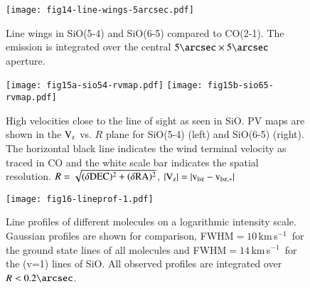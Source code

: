 \documentclass{aa}
\newcommand{\kms}{\,km\,s$^{-1}$~}
\begin{document}
\begin{figure}[ht]
    \centering
    \texttt{[image: fig14-line-wings-5arcsec.pdf]}
    \caption{Line wings in SiO(5-4) and SiO(6-5) compared to CO(2-1). The 
             emission is integrated over the central 
             $5\arcsec \times 5\arcsec$ aperture.}
    \label{siowingfig}
\end{figure}

\begin{figure}[ht]
    \centering
    \texttt{[image: fig15a-sio54-rvmap.pdf]}
    \texttt{[image: fig15b-sio65-rvmap.pdf]}
    \caption{High velocities close to the line of sight as seen in
             SiO. PV maps are shown in the ${\rm V_{z}}$ vs. $R$ plane 
             for SiO(5-4) (left) 
             and SiO(6-5) (right). The horizontal black line indicates 
             the wind terminal velocity as traced in CO and the white scale 
             bar indicates the spatial resolution.  
             $R = \sqrt{(\delta {\rm DEC})^2+(\delta {\rm RA})^2}$, 
             ${\rm |V_{z}|=|v_{\rm lsr}-v_{\rm lsr,*}|}$}
    \label{siostreamfig}
\end{figure}

\begin{figure}[ht]
    \centering
    \texttt{[image: fig16-lineprof-1.pdf]}
    \caption{Line profiles of different molecules on a logarithmic
      intensity scale. Gaussian profiles are shown for comparison,
      FWHM$=10$\kms for the ground state lines of all molecules and
      FWHM$=14$\kms for the (v=1) lines of SiO. All observed profiles
      are integrated over $R<0.2\arcsec$.}
    \label{wingfig}
\end{figure}
\end{document}
